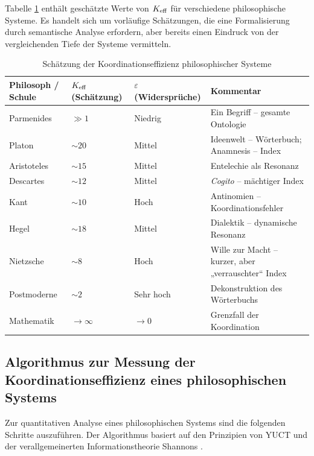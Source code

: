 \documentclass[12pt,a4paper]{article}
\newcommand{\eps}{\varepsilon}
\begin{document}
	Tabelle \ref{tab:keff-examples} enthält geschätzte Werte von \(\Keff\) für verschiedene philosophische Systeme. Es handelt sich um vorläufige Schätzungen, die eine Formalisierung durch semantische Analyse erfordern, aber bereits einen Eindruck von der vergleichenden Tiefe der Systeme vermitteln.
	
	\begin{table}[H]
		\centering
		\caption{Schätzung der Koordinationseffizienz philosophischer Systeme}
		\label{tab:keff-examples}
		\begin{tabular}{p{3.5cm}p{3.5cm}p{3.5cm}p{3.5cm}}
			\toprule
			\textbf{Philosoph / Schule} & \(\Keff\) (Schätzung) & \(\eps\) (Widersprüche) & \textbf{Kommentar} \\
			\midrule
			Parmenides & \(\gg 1\) & Niedrig & Ein Begriff – gesamte Ontologie \\
			Platon & \(\sim 20\) & Mittel & Ideenwelt – Wörterbuch; Anamnesis – Index \\
			Aristoteles & \(\sim 15\) & Mittel & Entelechie als Resonanz \\
			Descartes & \(\sim 12\) & Mittel & \textit{Cogito} – mächtiger Index \\
			Kant & \(\sim 10\) & Hoch & Antinomien – Koordinationsfehler \\
			Hegel & \(\sim 18\) & Mittel & Dialektik – dynamische Resonanz \\
			Nietzsche & \(\sim 8\) & Hoch & Wille zur Macht – kurzer, aber „verrauschter“ Index \\
			Postmoderne & \(\sim 2\) & Sehr hoch & Dekonstruktion des Wörterbuchs \\
			Mathematik & \(\to \infty\) & \(\to 0\) & Grenzfall der Koordination \\
			\bottomrule
		\end{tabular}
	\end{table}
	
	\subsection{Algorithmus zur Messung der Koordinationseffizienz eines philosophischen Systems}
	\label{subsec:measurement-algorithm}
	
	Zur quantitativen Analyse eines philosophischen Systems sind die folgenden Schritte auszuführen. Der Algorithmus basiert auf den Prinzipien von YUCT und der verallgemeinerten Informationstheorie Shannons \cite{AppendixX}.
	
\end{document}
